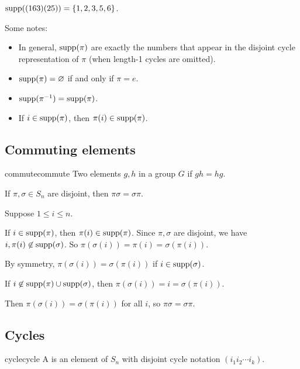 \documentclass[12pt,letterpaper]{report}
\begin{document}
\begin{ex}
  $\operatorname{supp}((163)(25)) = \{1, 2, 3, 5, 6\}$.
\end{ex}

Some notes:
\begin{itemize}
  \item
  In general, $\operatorname{supp}(\pi)$ are exactly the numbers that appear in the disjoint cycle representation
  of $\pi$ (when length-1 cycles are omitted).
  \item
  $\operatorname{supp}(\pi) = \varnothing$ if and only if $\pi = e$.
  \item
  $\operatorname{supp}(\pi^{-1}) = \operatorname{supp}(\pi)$.
  \item
  If $i \in \operatorname{supp}(\pi)$, then $\pi(i) \in \operatorname{supp}(\pi)$.
\end{itemize}

\pagebreak
\subsection{Commuting elements}

\begin{defn}{commute}{commute}
  Two elements $g, h$ in a group $G$  if $gh = hg$.
\end{defn}

\begin{lem}{}{}
  If $\pi, \sigma \in S_n$ are disjoint, then $\pi\sigma = \sigma\pi$.
\end{lem}

\begin{thmproof}
  Suppose $1 \leq i \leq n$.

  If $i \in \operatorname{supp}(\pi)$, then $\pi(i) \in \operatorname{supp}(\pi)$.
  Since $\pi, \sigma$ are disjoint, we have $i, \pi(i) \not\in \operatorname{supp}(\sigma)$.
  So $\pi(\sigma(i)) = \pi(i) = \sigma(\pi(i))$.

  By symmetry, $\pi(\sigma(i)) = \sigma(\pi(i))$ if $i \in \operatorname{supp}(\sigma)$.

  If $i \not\in \operatorname{supp}(\pi) \cup \operatorname{supp}(\sigma)$, then $\pi(\sigma(i)) = i = \sigma(\pi(i))$.

  Then $\pi(\sigma(i)) = \sigma(\pi(i))$ for all $i$, so $\pi\sigma = \sigma\pi$.
\end{thmproof}

\pagebreak
\subsection{Cycles}

\begin{defn}{cycle}{cycle}
  A  is an element of $S_n$ with disjoint cycle notation $(i_1 i_2 \cdots i_k)$.
\end{defn}
\end{document}

